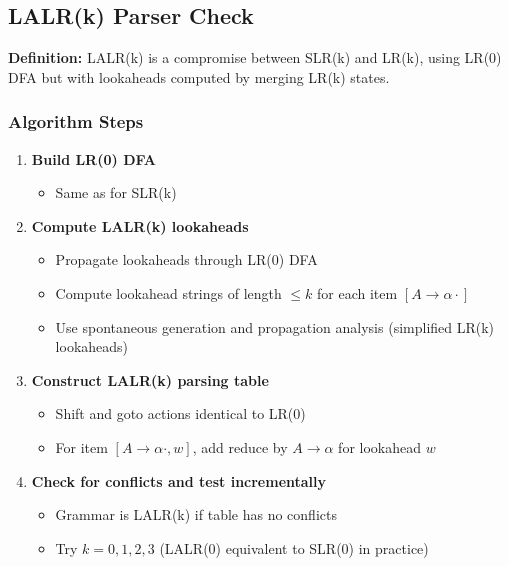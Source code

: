 \subsection{LALR(k) Parser Check}

\textbf{Definition:} LALR(k) is a compromise between SLR(k) and LR(k), using LR(0) DFA but with lookaheads computed by merging LR(k) states.

\subsubsection{Algorithm Steps}

\begin{enumerate}
    \item \textbf{Build LR(0) DFA}
    \begin{itemize}
        \item Same as for SLR(k)
    \end{itemize}
    
    \item \textbf{Compute LALR(k) lookaheads}
    \begin{itemize}
        \item Propagate lookaheads through LR(0) DFA
        \item Compute lookahead strings of length $\leq k$ for each item $[A \to \alpha \cdot]$
        \item Use spontaneous generation and propagation analysis (simplified LR(k) lookaheads)
    \end{itemize}
    
    \item \textbf{Construct LALR(k) parsing table}
    \begin{itemize}
        \item Shift and goto actions identical to LR(0)
        \item For item $[A \to \alpha \cdot, w]$, add reduce by $A \to \alpha$ for lookahead $w$
    \end{itemize}
    
    \item \textbf{Check for conflicts and test incrementally}
    \begin{itemize}
        \item Grammar is LALR(k) if table has no conflicts
        \item Try $k = 0, 1, 2, 3$ (LALR(0) equivalent to SLR(0) in practice)
    \end{itemize}
\end{enumerate}


